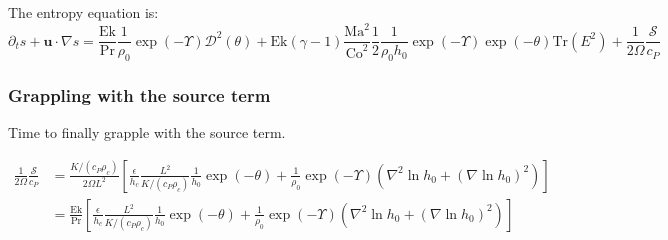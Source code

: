 \documentclass{aastex631}
\newcommand{\del}{\nabla}
\renewcommand{\vec}{\boldsymbol}
\newcommand{\scrD}{\mathcal{D}}
\newcommand{\scrS}{\mathcal{S}}
\begin{document}
The entropy equation is:
\begin{equation}
  \partial_t s + \vec{u}\cdot \del s =
  \frac{\mathrm{Ek}}{\mathrm{Pr}} \frac{1}{\rho_0} \exp(-\Upsilon)\scrD^2(\theta)
  + \mathrm{Ek} (\gamma-1)\frac{\mathrm{Ma}^{2}}{\mathrm{Co}^2} \frac{1}{2}\frac{1}{\rho_0 h_0}\exp(-\Upsilon) \exp(-\theta)\mathrm{Tr}(E^2)
  + \frac{1}{2 \Omega} \frac{\scrS}{c_P}
\end{equation}

\subsubsection{Grappling with the source term}
Time to finally grapple with the source term.

\begin{align}
  \frac{1}{2 \Omega} \frac{\scrS}{c_P}
&= \frac{K/(c_P \rho_c)}{2 \Omega L^2} \left[\frac{\epsilon}{h_c} \frac{L^2}{K/(c_P \rho_c)}\frac{1}{h_0}\exp(-\theta) +  \frac{1}{\rho_0} \exp(-\Upsilon) \left(\nabla^2 \ln h_0 + (\nabla \ln h_0)^2 \right)\right] \nonumber \\
&= \frac{\mathrm{Ek}}{\mathrm{Pr}}\left[\frac{\epsilon}{h_c} \frac{L^2}{K/(c_P \rho_c)}\frac{1}{h_0}\exp(-\theta) +  \frac{1}{\rho_0} \exp(-\Upsilon) \left(\nabla^2 \ln h_0 + (\nabla \ln h_0)^2 \right)\right]
\end{align}
\end{document}
